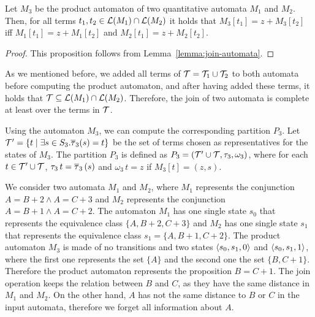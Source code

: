 \begin{proposition}\label{prop:join-automata}
    Let $M_3$ be the product automaton of two quantitative automata $M_1$ and $M_2$.
    Then, for all terms $t_1, t_2 \in \mathcal{L}(M_1) \cap \mathcal{L}(M_2)$ it holds that $M_3[t_1] = z + M_3[t_2]$ iff $M_1[t_1] = z + M_1[t_2]$ and $M_2[t_1] = z + M_2[t_2]$.
\end{proposition}
\begin{proof}
    This proposition follows from Lemma~\ref{lemma:join-automata}.
\end{proof}

As we mentioned before, we added all terms of $\mathcal{T} = \mathcal{T}_1 \cup \mathcal{T}_2$ to both automata before computing the product automaton, and after having added these terms, it holds that $\mathcal{T} \subseteq \mathcal{L}(M_1) \cap \mathcal{L}(M_2)$.
Therefore, the join of two automata is complete at least over the terms in $\mathcal{T}$.

Using the automaton $M_3$, we can compute the corresponding partition $P_3$.
Let $\mathcal{T}' = \{t \mid \exists s \in S_3 . \overline{\tau}_3(s) = t\}$ be the set of terms chosen as representatives for the states of $M_3$.
The partition $P_3$ is defined as $P_3 = (\mathcal{T}' \cup \mathcal{T}, \tau_3, \omega_3)$,
where for each $t \in \mathcal{T}' \cup \mathcal{T}$, $\tau_3\,t = \overline{\tau}_3\,(s)$ and $\omega_3\,t = z$ if $M_3[t] = (z,s)$.


\begin{example}
    We consider two automata $M_1$ and $M_2$, where $M_1$ represents the conjunction $A = B + 2 \land A = C + 3$ and $M_2$ represents the conjunction $A = B + 1 \land A = C + 2$.
    The automaton $M_1$ has one single state $s_0$ that represents the equivalence class $\{A, B+2, C+3\}$
    and $M_2$ has one single state $s_1$ that represents the equivalence class $s_1 = \{A, B+1, C+2\}$.
    The product automaton $M_3$ is made of no transitions and two states $\langle s_0, s_1, 0\rangle$ and $\langle s_0, s_1, 1\rangle$, where the first one represents the set $\{A\}$ and the second one the set $\{B, C+1\}$.
    Therefore the product automaton represents the proposition $B = C + 1$.
    The join operation keeps the relation between $B$ and $C$, as they have the same distance in $M_1$ and $M_2$.
    On the other hand, $A$ has not the same distance to $B$ or $C$ in the input automata, therefore we forget all information about $A$.
\end{example}

